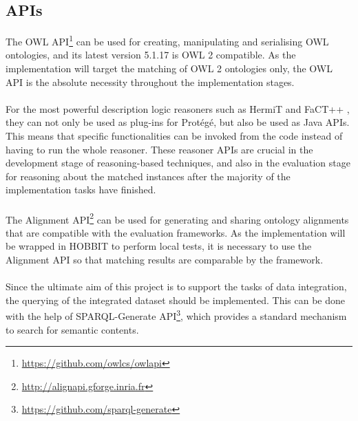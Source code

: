 \subsection{APIs}

The OWL API\footnote{\url{https://github.com/owlcs/owlapi}} can be used for creating, manipulating and serialising OWL ontologies, and its latest version 5.1.17 is OWL 2 compatible. As the implementation will target the matching of OWL 2 ontologies only, the OWL API is the absolute necessity throughout the implementation stages.
\\\\
For the most powerful description logic reasoners such as HermiT \cite{DBLP:journals/jar/GlimmHMSW14} and FaCT++ \cite{DBLP:conf/cade/TsarkovH06}, they can not only be used as plug-ins for Protégé, but also be used as Java APIs. This means that specific functionalities can be invoked from the code instead of having to run the whole reasoner. These reasoner APIs are crucial in the development stage of reasoning-based techniques, and also in the evaluation stage for reasoning about the matched instances after the majority of the implementation tasks have finished.
\\\\
The Alignment API\footnote{\url{http://alignapi.gforge.inria.fr}} can be used for generating and sharing ontology alignments that are compatible with the evaluation frameworks. As the implementation will be wrapped in HOBBIT to perform local tests, it is necessary to use the Alignment API so that matching results are comparable by the framework.
\\\\
Since the ultimate aim of this project is to support the tasks of data integration, the querying of the integrated dataset should be implemented. This can be done with the help of SPARQL-Generate API\footnote{\url{https://github.com/sparql-generate}}, which provides a standard mechanism to search for semantic contents.
